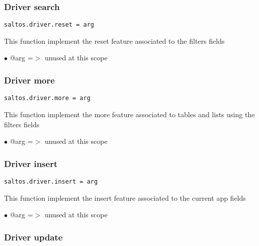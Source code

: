 \documentclass[a4paper]{article}
\begin{document}
\hypertarget{toc730}{}
\subsubsection{Driver search}

\begin{lstlisting}
saltos.driver.reset = arg
\end{lstlisting}

This function implement the reset feature associated to the filters fields

\begin{compactitem}
\item[\color{myblue}$\bullet$] @arg =$>$ unused at this scope
\end{compactitem}

\hypertarget{toc731}{}
\subsubsection{Driver more}

\begin{lstlisting}
saltos.driver.more = arg
\end{lstlisting}

This function implement the more feature associated to tables and lists
using the filters fields

\begin{compactitem}
\item[\color{myblue}$\bullet$] @arg =$>$ unused at this scope
\end{compactitem}

\hypertarget{toc732}{}
\subsubsection{Driver insert}

\begin{lstlisting}
saltos.driver.insert = arg
\end{lstlisting}

This function implement the insert feature associated to the current app fields

\begin{compactitem}
\item[\color{myblue}$\bullet$] @arg =$>$ unused at this scope
\end{compactitem}

\hypertarget{toc733}{}
\subsubsection{Driver update}
\end{document}
